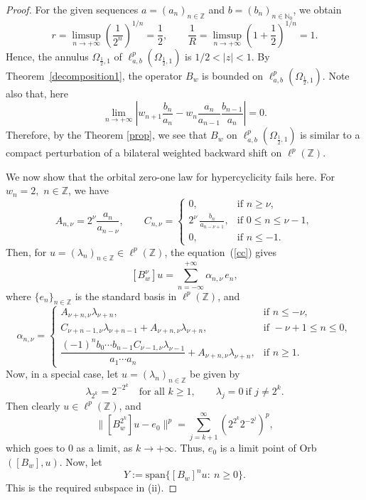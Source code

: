 \documentclass[12pt, reqno]{amsart}
\theoremstyle{definition}
\theoremstyle{remark}
\numberwithin{equation}{section}
\begin{document}
\begin{proof}
For the given sequences $a=(a_{n})_{n\in\mathbb{Z}}$ and $b=(b_{n})_{n\in\mathbb{N}_{0}}$, we obtain
\[
r=\limsup_{n\to +\infty}\left(\frac{1}{2^{n}}\right)^{1/n}=\frac{1}{2},
\qquad 
\frac{1}{R}=\limsup_{n\to +\infty}\left(1+\frac{1}{2}\right)^{1/n}=1.
\]
Hence, the annulus $\Omega_{\frac{1}{2},1}$ of $\ell^p_{a,b}(\Omega_{\frac{1}{2},1})$ is $1/2<|z|<1$. By Theorem~\ref{decomposition1}, the operator $B_{w}$ is bounded on $\ell^p_{a,b}(\Omega_{\frac{1}{2},1})$. Note also that, here
\[
\lim_{ n \rightarrow +\infty} \left\lvert w_{n+1}\frac{b_{n}}{a_{n}}-w_{n}\frac{a_n}{a_{n-1}}\frac{b_{n-1}}{a_{n}}\right\rvert=0.
\]
Therefore, by the Theorem \ref{prop}, we see that $B_{w}$ on $\ell^p_{a,b}(\Omega_{\frac{1}{2},1})$ is similar to a compact perturbation of a bilateral weighted backward shift on $\ell^{p}(\mathbb{Z}).$

We now show that the orbital zero-one law for hypercyclicity fails here. For $w_{n}=2,$ $n\in \mathbb{Z}$, we have
\[
A_{n,\nu}=2^{\nu}\frac{a_{n}}{a_{n-\nu}},
\qquad
C_{n,\nu}=
\begin{cases}
0, 
 & \text{if } n\ge \nu,\\[0.4em]

2^{\nu}\,\frac{b_{n}}{a_{n-\nu+1}}, 
 & \text{if } 0\leq n \leq \nu-1,\\[0.4em]

0, & \text{if } n\leq -1.
\end{cases}
\]
Then, for $u=(\lambda_{n})_{n\in \mathbb{Z}}\in \ell^{p}(\mathbb{Z})$, the equation~(\ref{cc}) gives
\[
[B_{w}^{\nu}]u=\sum_{n=-\infty}^{+\infty}\alpha_{n,\nu}\, e_{n},
\]
where $\{e_{n}\}_{n\in \mathbb{Z}}$ is the standard basis in $\ell^p(\mathbb{Z})$, and 
\[
\alpha_{n,\nu}=
\begin{cases}
A_{\nu+n,\nu}\lambda_{\nu+n}, & \text{if } n\leq -\nu,\\[0.5em]
C_{\nu+n-1,\nu}\lambda_{\nu+n-1}+A_{\nu+n,\nu}\lambda_{\nu+n}, & \text{if } -\nu+1\leq n\leq 0,\\[0.5em]
\dfrac{(-1)^{n}b_{0}\cdots b_{n-1}C_{\nu-1,\nu}\lambda_{\nu-1}}{a_{1}\cdots a_{n}}+A_{\nu+n,\nu}\lambda_{\nu+n}, & \text{if } n\geq 1.
\end{cases}
\]
Now, in a special case, let $u=(\lambda_{n})_{n\in \mathbb{Z}}$ be given by
\[
\lambda_{2^{k}}=2^{-2^{k}} \quad \text{for all } k\geq 1, 
\qquad 
\lambda_{j}=0 \ \text{if } j\neq 2^{k}.
\]
Then clearly $u\in \ell^{p}(\mathbb{Z})$, and 
\[
\big\|[B_{w}^{2^{k}}]u - e_{0}\big\|^{p}
   = \sum_{j=k+1}^{\infty}\left(2^{2^{k}}2^{-2^{j}}\right)^{p},
\]
which goes to $0$ as a limit, as $k\to +\infty.$ Thus, $e_{0}$ is a limit point of Orb$([B_{w}],u)$. Now, let 
\[
Y:= \text{span} \{[B_w]^nu:~n\geq 0\}. 
\]
This is the required subspace in (ii).


\end{proof}
\end{document}
